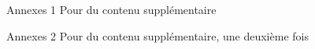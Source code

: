 \begin{frame}{Annexes 1}
    Pour du contenu supplémentaire
    
\end{frame}

\begin{frame}{Annexes 2}
    Pour du contenu supplémentaire, une deuxième fois
    
\end{frame}